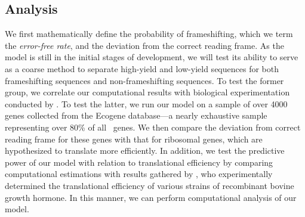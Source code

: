 \documentclass[article, oneside]{memoir}
\begin{document}
\subsection{Analysis}
We first mathematically define the probability of frameshifting,
which we term the \emph{error-free rate}, and the deviation from the
correct reading frame.  As the model is still in the initial stages
of development, we will test its ability to serve as a coarse method
to separate high-yield and low-yield sequences for both frameshifting
sequences and non-frameshifting sequences.  To test the former group,
we correlate our computational results with biological experimentation
conducted by \citet{weiss87}.  To test the latter, we run our model on
a sample of over 4000 genes collected from the Ecogene database---a nearly
exhaustive sample representing over 80\% of all \ecoli\ genes.  We then
compare the deviation from correct reading frame for these genes with
that for ribosomal genes, which are hypothesized to translate more 
efficiently.  In addition, we test the predictive power of our model
with relation to translational efficiency by comparing computational
estimations with results gathered by \citet{schoner}, who experimentally
determined the translational efficiency of various strains of recombinant
bovine growth hormone.  In this manner, we can perform computational analysis
of our model.

{}

\end{document}

